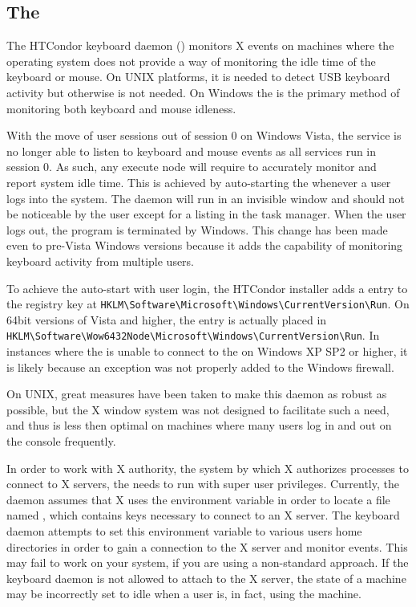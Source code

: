\subsection{\label{sec:kbdd}The }

The HTCondor keyboard daemon () monitors X events on
machines where the operating system does not provide a way of
monitoring the idle time of the keyboard or mouse.  On UNIX platforms,
it is needed to detect USB keyboard activity but otherwise is not
needed.  On Windows the  is the primary method of
monitoring both keyboard and mouse idleness.

With the move of user sessions out of session 0 on Windows Vista, the
 service is no longer able to listen to keyboard and
mouse events as all services run in session 0. As such, any execute
node will require  to accurately monitor and report system
idle time. This is achieved by auto-starting the  whenever
a user logs into the system. The daemon will run in an invisible
window and should not be noticeable by the user except for a listing
in the task manager. When the user logs out, the program is terminated
by Windows. This change has been made even to pre-Vista Windows
versions because it adds the capability of monitoring keyboard activity
from multiple users.

To achieve the auto-start with user login, the HTCondor installer adds a
 entry to the registry key at
\verb|HKLM\Software\Microsoft\Windows\CurrentVersion\Run|. On 64bit versions
of Vista and higher, the entry is actually placed in
\verb|HKLM\Software\Wow6432Node\Microsoft\Windows\CurrentVersion\Run|.  In
instances where the  is unable to connect to the
 on Windows XP SP2 or higher, it is likely because an
exception was not properly added to the Windows firewall.

On UNIX, great measures have been taken to make this daemon as robust
as possible, but the X window system was not designed to facilitate such a
need, and thus is less then optimal on machines where many users log
in and out on the console frequently.

In order to work with X authority, the system by which X authorizes
processes to connect to X servers, the  needs to
run with super user privileges.  Currently, the daemon assumes that X
uses the  environment variable in order to locate a file
named , which contains keys necessary to connect to
an X server.  The keyboard daemon attempts to set this environment
variable to various users home directories in order to gain a
connection to the X server and monitor events.  This may fail to work
on your system, if you are using a non-standard approach.  If the
keyboard daemon is not allowed to attach to the X server, the state of
a machine may be incorrectly set to idle when a user is, in fact,
using the machine.

